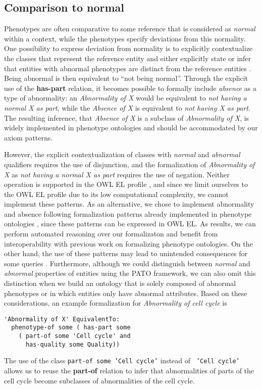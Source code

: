 \documentclass{bioinfo}
\renewcommand{\cite}{\citep}
\begin{document}
\subsection{Comparison to normal}
Phenotypes are often comparative to some reference that is considered
as {\em normal} within a context, while the phenotypes specify
deviations from this normality. One possibility to express deviation
from normality is to explicitly contextualize the classes that
represent the reference entity and either explicitly state or infer
that entities with abnormal phenotypes are distinct from the reference
entities \cite{Hoehndorf2010phene}. Being abnormal is then equivalent
to ``not being normal''. Through the explicit use of the {\bf
  has-part} relation, it becomes possible to formally include {\em
  absence} as a type of abnormality: an {\em Abnormality of X} would
be equivalent to {\em not having a normal X as part}, while the {\em
  Absence of X} is equivalent to {\em not having X as part}. The
resulting inference, that {\em Absence of X} is a subclass of {\em
  Abnormality of X}, is widely implemented in phenotype ontologies
and should be accommodated by our axiom patterns. 

However, the explicit contextualization of classes with {\em normal}
and {\em abnormal} qualifiers requires the use of disjunction, and the
formalization of {\em Abnormality of X} as {\em not having a normal X
  as part} requires the use of negation. Neither operation is
supported in the OWL EL profile \cite{owlprofiles}, and since we limit
ourselves to the OWL EL profile due to its low computational
complexity, we cannot implement these patterns.  As an alternative, we
chose to implement abnormality and absence following formalization
patterns already implemented in phenotype ontologies
\cite{Mungall2010, Hoehndorf2011phenome}, since these patterns can be
expressed in OWL EL. As results, we can perform automated reasoning
over our formalizaton and benefit from interoperability with previous
work on formalizing phenotype ontologies. On the other hand, the use
of these patterns may lead to unintended consequences for some queries
\cite{Boeker2011}.  Furthermore, although we could distinguish between
{\em normal} and {\em abnormal} properties of entities using the PATO
framework, we can also omit this distinction when we build an ontology
that is solely composed of abnormal phenotypes or in which entities
only have abnormal attributes.  Based on these considerations, an
example formalization for {\em Abnormality of cell cycle} is
\begin{verbatim}
'Abnormality of X' EquivalentTo:
  phenotype-of some ( has-part some
    ( part-of some 'Cell cycle' and
      has-quality some Quality))
\end{verbatim}
The use of the class {\tt part-of some 'Cell cycle'} instead of {\tt
  'Cell cycle'} allows us to reuse the {\bf part-of} relation to infer
that abnormalities of parts of the cell cycle become subclasses of
abnormalities of the cell cycle.
\end{document}
